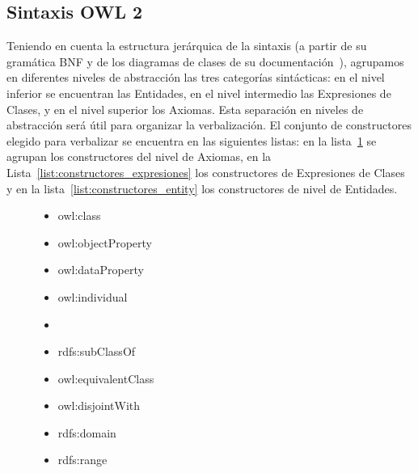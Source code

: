 \subsection{Sintaxis OWL 2}
\label{sec:gen_doc_sintaxis_owl}
Teniendo en cuenta la estructura jerárquica de la sintaxis (a partir de su gramática BNF y de los diagramas de clases de su documentación~\cite{OWL2W3C}), agrupamos en diferentes niveles de abstracción las tres categorías sintácticas: en el nivel inferior se encuentran las Entidades, en el nivel intermedio las Expresiones de Clases, y en el nivel superior los Axiomas. Esta separación en niveles de abstracción será útil para organizar la verbalización. El conjunto de constructores elegido para verbalizar se encuentra en las siguientes listas: en la lista~\ref{list:constructores_axiomas} se agrupan los constructores del nivel de Axiomas, en la Lista~\ref{list:constructores_expresiones} los constructores de Expresiones de Clases y en la lista~\ref{list:constructores_entity} los constructores de nivel de Entidades.
\begin{figure}
\begin{multicols}{2}
\label{list:constructores_entity}
    \begin{itemize}
        \item owl:class
        \item owl:objectProperty
        \item owl:dataProperty
        \item owl:individual
        \item[\vspace{\fill}]
    \end{itemize}

\label{list:constructores_axiomas}
    \begin{itemize}
        \item rdfs:subClassOf
        \item owl:equivalentClass
        \item owl:disjointWith
        \item rdfs:domain
        \item rdfs:range
    \end{itemize}
    \end{multicols}
\end{figure}


